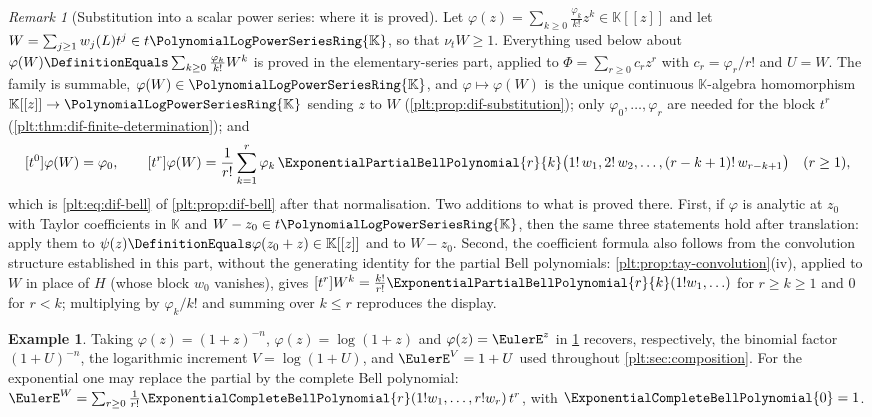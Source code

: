 \documentclass[11pt,oneside]{article}
\theoremstyle{plain}
\theoremstyle{definition}
\newtheorem{example}[theorem]{Example}
\theoremstyle{remark}
\newtheorem{remark}[theorem]{Remark}
\newcommand{\K}{\mathbb{K}}
\newcommand{\PLpow}{\PolynomialLogPowerSeriesRing{\K}}   %
\newcommand{\ordt}{\nu_{t}}                              %
\begin{document}
\begin{remark}[Substitution into a scalar power series: where it is proved]
\label{plt:prop:tay-scalar-outer}
Let \(\varphi(z)=\sum_{k\ge0}\frac{\varphi_{k}}{k!}z^{k}\in\K[[z]]\) and let
\(W=\sum_{j\ge1}w_{j}(L)t^{j}\in t\PLpow\), so that \(\ordt W\ge1\).
Everything used below about
\(\varphi(W)\DefinitionEquals\sum_{k\ge0}\frac{\varphi_{k}}{k!}W^{k}\) is
proved in the elementary-series part, applied to
\(\Phi=\sum_{r\ge0}c_{r}z^{r}\) with \(c_{r}=\varphi_{r}/r!\) and \(U=W\).
The family is summable, \(\varphi(W)\in\PLpow\), and
\(\varphi\mapsto\varphi(W)\) is the unique continuous \(\K\)-algebra
homomorphism \(\K[[z]]\to\PLpow\) sending \(z\) to \(W\)
(\cref{plt:prop:dif-substitution}); only \(\varphi_{0},\ldots,\varphi_{r}\)
are needed for the block \(t^{r}\)
(\cref{plt:thm:dif-finite-determination}); and
\[
 [t^{0}]\varphi(W)=\varphi_{0},
 \qquad
 [t^{r}]\varphi(W)
 =\frac{1}{r!}\sum_{k=1}^{r}\varphi_{k}\,
   \ExponentialPartialBellPolynomial{r}{k}
   \bigl(1!\,w_{1},2!\,w_{2},\ldots,(r-k+1)!\,w_{r-k+1}\bigr)
 \quad(r\ge1),
\]
which is \eqref{plt:eq:dif-bell} of \cref{plt:prop:dif-bell} after that
normalisation.  Two additions to what is proved there.  First, if \(\varphi\)
is analytic at \(z_{0}\) with Taylor coefficients in \(\K\) and
\(W-z_{0}\in t\PLpow\), then the same three statements hold after
translation: apply them to
\(\psi(z)\DefinitionEquals\varphi(z_{0}+z)\in\K[[z]]\) and to \(W-z_{0}\).
Second, the coefficient formula also follows from the convolution structure
established in this part, without the generating identity for the partial Bell
polynomials: \cref{plt:prop:tay-convolution}(iv), applied to \(W\) in place of
\(H\) (whose block \(w_{0}\) vanishes), gives
\([t^{r}]W^{k}
=\frac{k!}{r!}\ExponentialPartialBellPolynomial{r}{k}(1!w_{1},\ldots)\) for
\(r\ge k\ge1\) and \(0\) for \(r<k\); multiplying by \(\varphi_{k}/k!\) and
summing over \(k\le r\) reproduces the display.
\end{remark}

\begin{example}\label{plt:ex:tay-standard-outer}
Taking \(\varphi(z)=(1+z)^{-n}\), \(\varphi(z)=\log(1+z)\) and
\(\varphi(z)=\EulerE^{z}\) in
\cref{plt:prop:tay-scalar-outer} recovers, respectively, the binomial factor
\((1+U)^{-n}\), the logarithmic increment \(V=\log(1+U)\), and
\(\EulerE^{V}=1+U\) used throughout \cref{plt:sec:composition}.  For the
exponential one may replace the partial by the complete Bell polynomial:
\(\EulerE^{W}=\sum_{r\ge0}\frac{1}{r!}
 \ExponentialCompleteBellPolynomial{r}(1!w_{1},\ldots,r!w_{r})\,t^{r}\),
with \(\ExponentialCompleteBellPolynomial{0}=1\).
\end{example}
\end{document}
